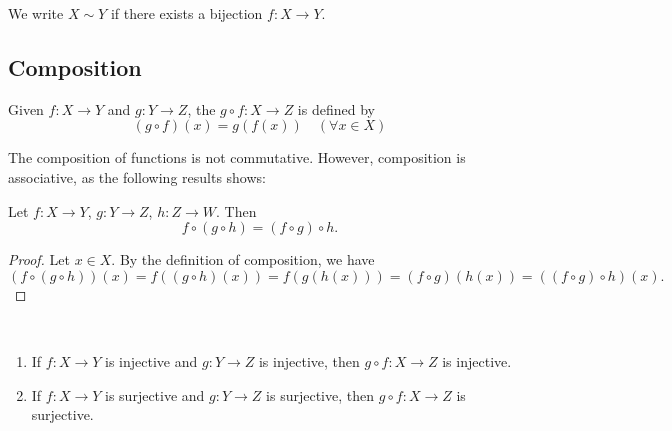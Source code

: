 \begin{notation}
We write $X\sim Y$ if there exists a bijection $f:X\to Y$.
\end{notation}

\subsection{Composition}
\begin{definition}[Composition]
Given $f:X\to Y$ and $g:Y\to Z$, the  $g\circ f:X\to Z$ is defined by
\[ (g \circ f)(x)=g(f(x))\quad(\forall x \in X)\]
\end{definition}

The composition of functions is not commutative. However, composition is associative, as the following results shows:

\begin{proposition}
Let $f:X\to Y$, $g:Y\to Z$, $h:Z\to W$. Then
\[f\circ (g\circ h)=(f\circ g)\circ h.\]
\end{proposition}

\begin{proof}
Let $x \in X$. By the definition of composition, we have
\[ (f \circ (g \circ h))(x) = f((g \circ h)(x)) = f(g(h(x))) = (f \circ g)(h(x)) = ((f \circ g) \circ h)(x). \]
\end{proof}

\begin{proposition} \
\begin{enumerate}[label=(\roman*)]
\item If $f:X \to Y$ is injective and $g:Y \to Z$ is injective, then $g \circ f:X \to Z$ is injective.
\item If $f:X\to Y$ is surjective and $g:Y\to Z$ is surjective, then $g \circ f:X\to Z$ is surjective.
\end{enumerate}
\end{proposition}

